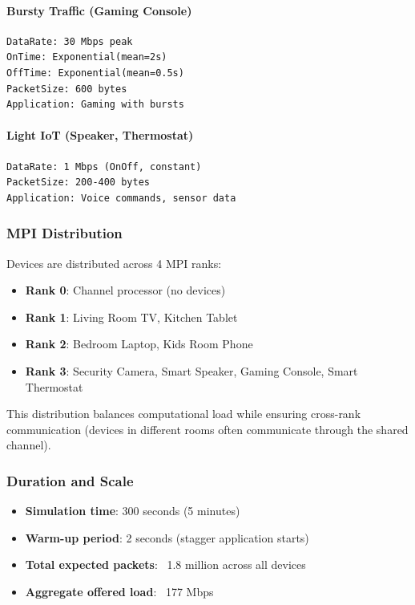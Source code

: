 \paragraph{Bursty Traffic (Gaming Console)}
\begin{lstlisting}[style=cpp]
DataRate: 30 Mbps peak
OnTime: Exponential(mean=2s)
OffTime: Exponential(mean=0.5s)
PacketSize: 600 bytes
Application: Gaming with bursts
\end{lstlisting}

\paragraph{Light IoT (Speaker, Thermostat)}
\begin{lstlisting}[style=cpp]
DataRate: 1 Mbps (OnOff, constant)
PacketSize: 200-400 bytes
Application: Voice commands, sensor data
\end{lstlisting}

\subsubsection{MPI Distribution}

Devices are distributed across 4 MPI ranks:
\begin{itemize}
    \item \textbf{Rank 0}: Channel processor (no devices)
    \item \textbf{Rank 1}: Living Room TV, Kitchen Tablet
    \item \textbf{Rank 2}: Bedroom Laptop, Kids Room Phone
    \item \textbf{Rank 3}: Security Camera, Smart Speaker, Gaming Console, Smart Thermostat
\end{itemize}

This distribution balances computational load while ensuring cross-rank communication (devices in different rooms often communicate through the shared channel).

\subsubsection{Duration and Scale}

\begin{itemize}
    \item \textbf{Simulation time}: 300 seconds (5 minutes)
    \item \textbf{Warm-up period}: 2 seconds (stagger application starts)
    \item \textbf{Total expected packets}: ~1.8 million across all devices
    \item \textbf{Aggregate offered load}: ~177 Mbps
\end{itemize}

